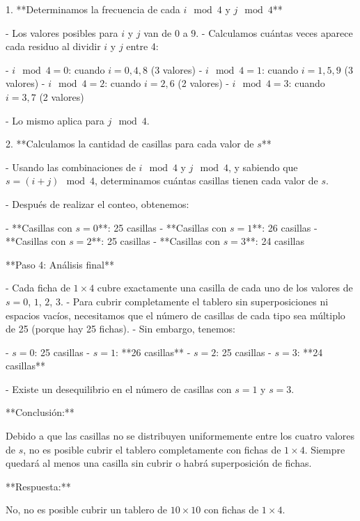 \documentclass[11pt]{scrartcl}
\begin{document}
\begin{problem}
\begin{hint}
\begin{solu}
1. **Determinamos la frecuencia de cada $i \mod 4$ y $j \mod 4$**

   - Los valores posibles para $i$ y $j$ van de $0$ a $9$.
   - Calculamos cuántas veces aparece cada residuo al dividir $i$ y $j$ entre 4:

     - $i \mod 4 = 0$: cuando $i = 0, 4, 8$ (3 valores)
     - $i \mod 4 = 1$: cuando $i = 1, 5, 9$ (3 valores)
     - $i \mod 4 = 2$: cuando $i = 2, 6$ (2 valores)
     - $i \mod 4 = 3$: cuando $i = 3, 7$ (2 valores)

   - Lo mismo aplica para $j \mod 4$.

2. **Calculamos la cantidad de casillas para cada valor de $s$**

   - Usando las combinaciones de $i \mod 4$ y $j \mod 4$, y sabiendo que $s = (i + j) \mod 4$, determinamos cuántas casillas tienen cada valor de $s$.

   - Después de realizar el conteo, obtenemos:

     - **Casillas con $s = 0$**: 25 casillas
     - **Casillas con $s = 1$**: 26 casillas
     - **Casillas con $s = 2$**: 25 casillas
     - **Casillas con $s = 3$**: 24 casillas

**Paso 4: Análisis final**

- Cada ficha de $1 \times 4$ cubre exactamente una casilla de cada uno de los valores de $s = 0$, $1$, $2$, $3$.
- Para cubrir completamente el tablero sin superposiciones ni espacios vacíos, necesitamos que el número de casillas de cada tipo sea múltiplo de 25 (porque hay 25 fichas).
- Sin embargo, tenemos:

  - $s = 0$: 25 casillas
  - $s = 1$: **26 casillas**
  - $s = 2$: 25 casillas
  - $s = 3$: **24 casillas**

- Existe un desequilibrio en el número de casillas con $s = 1$ y $s = 3$.

**Conclusión:**

Debido a que las casillas no se distribuyen uniformemente entre los cuatro valores de $s$, no es posible cubrir el tablero completamente con fichas de $1 \times 4$. Siempre quedará al menos una casilla sin cubrir o habrá superposición de fichas.

**Respuesta:**

No, no es posible cubrir un tablero de $10 \times 10$ con fichas de $1 \times 4$.
\end{solu}
\end{hint}
\end{problem}
\end{document}
